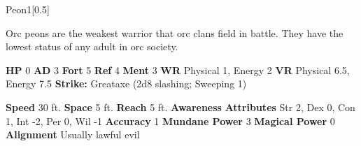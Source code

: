   \begin{monsubsection}{Peon}{1}[0.5]
    \vspace{-1em}\vspace{-1em}
    \vspace{0em}

    
        Orc peons are the weakest warrior that orc clans field in battle.
        They have the lowest status of any adult in orc society.
      
    

    \begin{spellcontent}
      \begin{spelltargetinginfo}
        \pari \textbf{HP} 0 \monsep
          \textbf{AD} 3 \monsep
          \textbf{Fort} 5 \monsep
          \textbf{Ref} 4 \monsep
          \textbf{Ment} 3
        \pari \textbf{WR} Physical 1, Energy 2 \monsep
        \textbf{VR} Physical 6.5, Energy 7.5
        \pari \textbf{Strike:}
            Greataxe  (2d8 slashing; Sweeping 1)
      \end{spelltargetinginfo}
    \end{spellcontent}
    \begin{monsterfooter}
      \pari \textbf{Speed} 30 ft. \monsep
        \textbf{Space} 5 ft. \monsep
        \textbf{Reach} 5 ft.
      \pari \textbf{Awareness} 
      \pari \textbf{Attributes}
        Str 2, Dex 0,
        Con 1, Int -2,
        Per 0, Wil -1
      \pari \textbf{Accuracy} 1 \monsep
        \textbf{Mundane Power} 3 \monsep
      \textbf{Magical Power} 0
      \pari \textbf{Alignment} Usually lawful evil
    \end{monsterfooter}
  \end{monsubsection}
  
